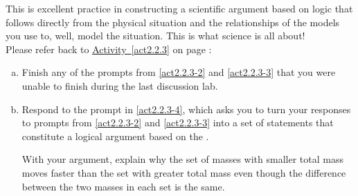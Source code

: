 \label{fnt2.2.3-1}

This \FNT{} is excellent practice in constructing a scientific argument based on logic that follows directly from the physical situation and the relationships of the models you use to, well, model the situation. This is what science is all about!\\

\noindent Please refer back to \hyperref[act2.2.3]{Activity~\ref*{act2.2.3}} on page \pageref{act2.2.3}:

\begin{enumerate}[(a)]
	\item Finish any of the prompts from \ref{act2.2.3-2} and \ref{act2.2.3-3} that you were unable to finish during the last discussion lab.
	\label{fnt2.2.3-1a}
	
	\item  Respond to the prompt in \ref{act2.2.3-4}, which asks you to turn your responses to prompts from \ref{act2.2.3-2} and \ref{act2.2.3-3} into a set of statements that constitute a logical argument based on the \EnergyInteractionModel{}.
	
		With your argument, explain why the set of masses with smaller total mass moves faster than the set with greater total mass even though the difference between the two masses in each set is the same.
	\label{fnt2.2.3-1b}
\end{enumerate}